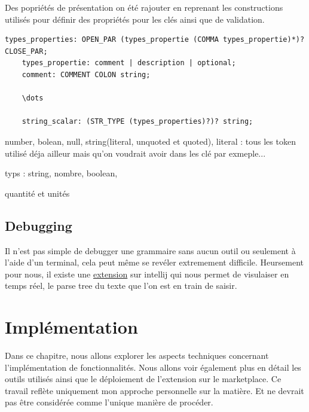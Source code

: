 \documentclass[
    iict, %
    il, %
]{heig-tb}
\begin{document}
Des popriétés de présentation on été rajouter en reprenant les constructions utilisés pour définir des propriétés pour les clés ainsi que de validation.

\begin{lstlisting}[frame=single,caption={types properties},label={types_properties}]
    types_properties: OPEN_PAR (types_propertie (COMMA types_propertie)*)? CLOSE_PAR;
    types_propertie: comment | description | optional;
    comment: COMMENT COLON string;

    \dots

    string_scalar: (STR_TYPE (types_properties)?)? string;
\end{lstlisting}

number, bolean, null, string(literal, unquoted et quoted),
literal : tous les token utilisé déja ailleur mais qu'on voudrait avoir dans les clé par exmeple...

typs : string, nombre, boolean,

quantité et unités



\section{Debugging}

Il n'est pas simple de debugger une grammaire sans aucun outil ou seulement à l'aide d'un terminal, cela peut même se revéler extremement difficile.
Heursement pour nous, il existe une \href{https://plugins.jetbrains.com/plugin/7358-antlr-v4}{extension} sur intellij qui nous permet de visulaiser en temps réel, le parse tree du texte que l'on est en train de saisir.




\chapter{Implémentation}
Dans ce chapitre, nous allons explorer les aspects techniques concernant l'implémentation de fonctionnalités. Nous allons voir également plus en détail les outils utilisés ainsi que le déploiement de l'extension sur le marketplace.
Ce travail reflète uniquement mon approche personnelle sur la matière. Et ne devrait pas être considérée comme l'unique manière de procéder.

\end{document}
